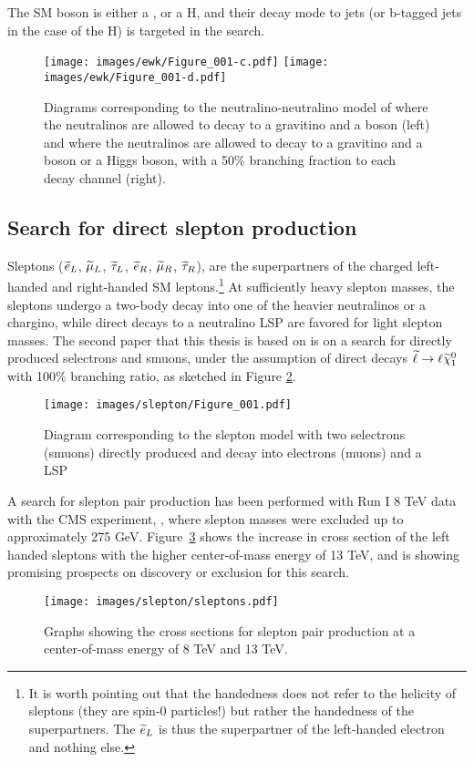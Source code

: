 The SM boson is either a \PW, \PZ or a H, and their decay mode to jets (or b-tagged jets in the case of the H) is targeted in the search.   
\begin{figure}[!htp]
\centering
\texttt{[image: images/ewk/Figure\_001-c.pdf]}
\texttt{[image: images/ewk/Figure\_001-d.pdf]}
\caption{Diagrams corresponding to the neutralino-neutralino model of where the neutralinos are allowed to decay to a gravitino and a \PZ boson (left) and where the neutralinos are allowed to decay to a gravitino and a \PZ boson or a Higgs boson, with a 50\% branching fraction to each decay channel (right).}
\label{sig:feynmanHiggsino}
\end{figure}                                                                                                                    
\subsection*{Search for direct slepton production}\label{sec:searchSlepton}
\noindent\justify
Sleptons ($\widetilde{e}_{L}$, $\widetilde{\mu}_{L}$, $\widetilde{\tau}_{L}$, $\widetilde{e}_{R}$, $\widetilde{\mu}_{R}$, $\widetilde{\tau}_{R}$), are the superpartners of the charged left-handed and right-handed SM leptons.\footnote{It is worth pointing out that the handedness does not refer to the helicity of sleptons (they are spin-0 particles!) but rather the handedness of the superpartners. The $\widetilde{e}_{L}$ is thus the superpartner of the left-handed electron and nothing else.} 
At sufficiently heavy slepton masses, the sleptons undergo a two-body decay into one of the heavier neutralinos or a chargino, while direct decays to a neutralino LSP are favored for light slepton masses.
The second paper that this thesis is based on is on a search for directly produced selectrons and smuons, under the assumption of direct decays $\widetilde{\ell}\to \ell\widetilde{\chi}^{0}_{1}$ with 100\% branching ratio, as sketched in Figure \ref{fig:feynmanSlepton}.
\begin{figure}[!htp]
\centering
\texttt{[image: images/slepton/Figure\_001.pdf]}
\caption{Diagram corresponding to the slepton model with two selectrons (smuons) directly produced and decay into electrons (muons) and a LSP} 
\label{fig:feynmanSlepton}
\end{figure}                                                                                                                                           
A search for slepton pair production has been performed with Run I 8 TeV data with the CMS experiment, \cite{Khachatryan:2014qwa}, where slepton masses were excluded up to approximately 275 GeV. 
Figure~\ref{sig:xsec} shows the increase in cross section of the left handed sleptons with the higher center-of-mass energy of 13 TeV, and is showing promising prospects on discovery or exclusion for this search.
\begin{figure}[!h]
\centering
\texttt{[image: images/slepton/sleptons.pdf]}
\caption{Graphs showing the cross sections for slepton pair production at a center-of-mass energy of 8 TeV and 13 TeV.}
\label{sig:xsec}
\end{figure}                                                                                                                                                               
